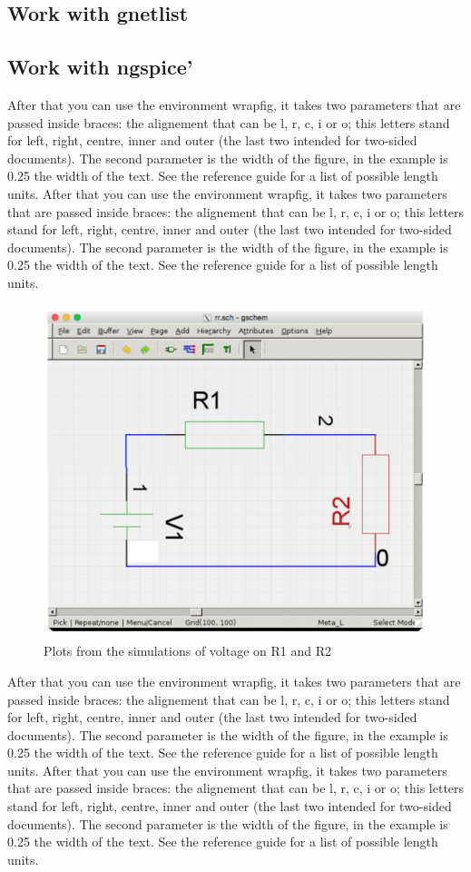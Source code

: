 \documentclass{report}
\begin{document}
\subsection{ Work with gnetlist}
 

 
\subsection{Work with ngspice’}
 After that you can use the environment wrapfig, it takes two parameters that are passed inside braces: the alignement that can be l, r, c, i or o; this letters stand for left, right, centre, inner and outer (the last two intended for two-sided documents). The second parameter is the width of the figure, in the example is 0.25 the width of the text. See the reference guide for a list of possible length units.
 After that you can use the environment wrapfig, it takes two parameters that are passed inside braces: the alignement that can be l, r, c, i or o; this letters stand for left, right, centre, inner and outer (the last two intended for two-sided documents). The second parameter is the width of the figure, in the example is 0.25 the width of the text. See the reference guide for a list of possible length units. \cite{sharelatex,thirdRef}
 
 \begin{figure}[h]
 \centering
\includegraphics[width=0.6\linewidth]{Figures/one} 
\caption{Plots from the simulations of voltage on R1 and R2}
\label{fig:figure5}
\end{figure}




 After that you can use the environment wrapfig, it takes two parameters that are passed inside braces: the alignement that can be l, r, c, i or o; this letters stand for left, right, centre, inner and outer (the last two intended for two-sided documents). The second parameter is the width of the figure, in the example is 0.25 the width of the text. See the reference guide for a list of possible length units.
 After that you can use the environment wrapfig, it takes two parameters that are passed inside braces: the alignement that can be l, r, c, i or o; this letters stand for left, right, centre, inner and outer (the last two intended for two-sided documents). The second parameter is the width of the figure, in the example is 0.25 the width of the text. See the reference guide for a list of possible length units.\cite{sharelatex,thirdRef}
 
\end{document}
